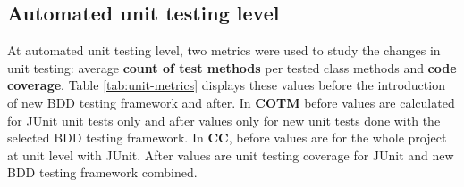 \subsection{Automated unit testing level}
\label{subsub:unit-level-metrics}
At automated unit testing level, two metrics were used to study the changes in unit testing: average \textbf{count of test methods}
per tested class methods and \textbf{code coverage}. Table \ref{tab:unit-metrics} displays these values before the introduction
of new BDD testing framework and after. In \textbf{COTM} before values are calculated for JUnit unit tests only and after
values only for new unit tests done with the selected BDD testing framework. In \textbf{CC}, before values are for the
whole project at unit level with JUnit. After values are unit testing coverage for JUnit and new BDD testing framework
combined.

{\renewcommand{\arraystretch}{1.3}
\begin{table}[H]
        \caption {Unit level testing metrics in projects and their change} \label{tab:unit-metrics}

\end{table}
}

